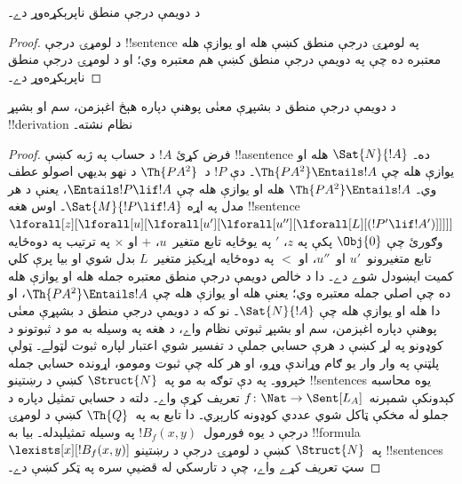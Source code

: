 \documentclass[../../../include/open-logic-section]{subfiles}
\begin{document}



\begin{thm}
د دويمې درجې منطق ناپرېکړه‌وړ دے۔
\end{thm}

\begin{proof}
د لومړۍ درجې !!{sentence} په لومړۍ درجې منطق کښې هله او يوازې هله
معتبره ده چې په دويمې درجې منطق کښې هم معتبره وي؛ او د لومړۍ درجې
منطق ناپرېکړه‌وړ دے۔
\end{proof}

\begin{thm}
د دويمې درجې منطق د بشپړې معنٰی پوهنې دپاره هېڅ اغېزمن، سم او بشپړ !!{derivation} نظام نشته۔
\end{thm}

\begin{proof}
فرض کړئ $!A$ د حساب په ژبه کښې !!a{sentence} ده۔ $\Sat{N}{!A}$ هله
او يوازې هله چې $\Th{PA^2} \Entails !A$۔ دې $!P$ د~$\Th{PA^2}$ د نهو
بديهي اصولو عطف وي۔ $\Th{PA^2} \Entails !A$ هله او يوازې هله چې
$\Entails !P \lif !A$، يعنې د هر مدل په اړه $\Sat{M}{!P \lif !A}$۔
اوس هغه !!{sentence}
$\lforall[z][\lforall[u][\lforall[u'][\lforall[u''][\lforall[L][(!P' \lif !A')]]]]]$
وګورئ چې $\Obj{0}$ پکې په $z$، $\prime$ په يوځايه تابع متغير~$u$،
$+$ او $\times$ په ترتيب په دوه‌ځايه تابع متغيرونو~$u'$ او~$u''$،
او $<$ په دوه‌ځايه اړيکيز متغير~$L$ بدل شوي او بيا پرې کلي کميت
ايښودل شوے دے۔ دا د خالص دويمې درجې منطق معتبره جمله هله او يوازې
هله ده چې اصلي جمله معتبره وي؛ يعنې هله او يوازې هله چې
$\Th{PA^2} \Entails !A$، او دا هله او يوازې هله چې $\Sat{N}{!A}$۔
نو که د دويمې درجې منطق د بشپړې معنٰی پوهنې دپاره اغېزمن، سم او بشپړ ثبوتي نظام واے، د هغه په
وسيله به مو د ثبوتونو د کوډونو په لړ کښې د هرې حسابي جملې د تفسير شوي اعتبار لپاره ثبوت لټولے۔ ټولې پلټنې په وار وار يو ګام وړاندې وړو، او هر کله چې ثبوت ومومو، اړونده حسابي جمله خپروو۔ په دې توګه به مو په~$\Struct{N}$ کښې د رښتينو !!{sentence}s يوه محاسبه
کېدونکې شمېرنه~$f\colon \Nat \to \Sent[L_A]$ تعريف کړې واے۔ دلته د حسابي تمثيل دپاره د جملو له مخکې ټاکل شوي عددي کوډونه کارېږي۔ دا تابع
به په~$\Th{Q}$ کښې د لومړۍ درجې د يوه فورمول~$!B_f(x, y)$ په وسيله
تمثيلېدله۔ بيا به !!{formula}~$\lexists[x][!B_f(x, y)]$ په~$\Struct{N}$
کښې د لومړۍ درجې د رښتينو !!{sentence}s سټ تعريف کړے واے، چې د
تارسکي له قضيې سره په ټکر کښې دے۔
\end{proof}
\end{document}
